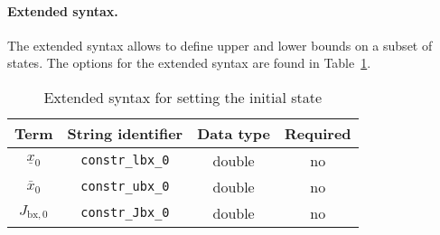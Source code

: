 \documentclass[english]{article}
\newcommand{\code}[1]{\texttt{#1}}
\newcommand{\optional}{no}
\begin{document}
\paragraph{Extended syntax.}
The extended syntax allows to define upper and lower bounds on a subset of states.
The options for the extended syntax are found in Table~\ref{tab:constraints:extendedsyntax}.
\begin{table}[ht!]
    \centering
    \caption{Extended syntax for setting the initial state} \label{tab:constraints:extendedsyntax}
    \begin{tabular}{cccc}
        \toprule
        Term & String identifier & Data type & Required \\ \midrule
        $ \underline{x}_0 $ & \code{constr\_lbx\_0} & double & \optional \\
        $ \bar{x}_0 $ & \code{constr\_ubx\_0} & double & \optional \\
        $ J_{\textrm{bx},0} $ & \code{constr\_Jbx\_0} & double & \optional \\
        \bottomrule
    \end{tabular}
\end{table}
%
\end{document}
